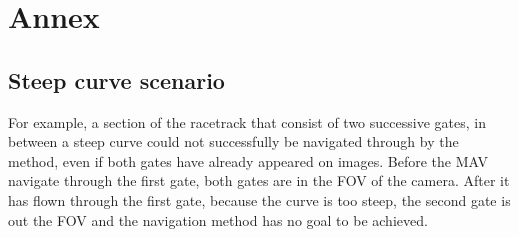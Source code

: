 \chapter{Annex}

\section{Steep curve scenario}

For example, a section of the racetrack that consist of two successive gates, in between a steep curve
could not successfully be navigated through by the method, even if both gates have already appeared on images.
Before the MAV navigate through the first gate, both gates are in the FOV of the camera.
After it has flown through the first gate, because the curve is too steep, the second gate is out the FOV 
and the navigation method has no goal to be achieved.



